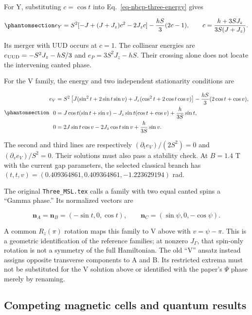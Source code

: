 For Y, substituting \(c=\cos t\) into Eq.~\ref{eq-nbcp-three-energy}
gives

\begin{equation}\phantomsection\label{eq-nbcp-y-energy}{
e_Y=S^2[-J+(J+J_z)c^2-2J_zc]-\frac{hS}{3}(2c-1),
\qquad c=\frac{h+3SJ_z}{3S(J+J_z)}.
}\end{equation}

Its merger with UUD occurs at \(c=1\). The collinear energies are
\(e_{\rm UUD}=-S^2J_z-hS/3\) and \(e_P=3S^2J_z-hS\). Their crossing
alone does not locate the intervening canted phase.

For the V family, the energy and two independent stationarity conditions
are

\begin{equation}\phantomsection\label{eq-nbcp-v-stationarity}{
\begin{aligned}
e_V={}&S^2\left[J(\sin^2t+2\sin t\sin v)
+J_z(\cos^2t+2\cos t\cos v)\right]
-\frac{hS}{3}(2\cos t+\cos v),\\
0={}&J\cos t(\sin t+\sin v)-J_z\sin t(\cos t+\cos v)
+\frac{h}{3S}\sin t,\\
0={}&2J\sin t\cos v-2J_z\cos t\sin v+\frac{h}{3S}\sin v.
\end{aligned}
}\end{equation}

The second and third lines are respectively
\((\partial_t e_V)/(2S^2)=0\) and \((\partial_v e_V)/S^2=0\). Their
solutions must also pass a stability check. At \(B=1.4\) T with the
current gap parameters, the selected classical branch has
\((t,t,v)=(0.409364861,0.409364861,-1.223629194)\) rad.

The original {\small\texttt{\nolinkurl{Three_MSL.tex}}} calls a family
with two equal canted spins a ``Gamma phase.'' Its normalized vectors
are

\[
\mathbf n_A=\mathbf n_B=(-\sin t,0,\cos t),
\qquad \mathbf n_C=(\sin\psi,0,-\cos\psi).
\]

A common \(R_z(\pi)\) rotation maps this family to V above with
\(v=\psi-\pi\). This is a geometric identification of the reference
families; at nonzero \(J_\Gamma\), that spin-only rotation is not a
symmetry of the full Hamiltonian. The old ``V'' ansatz instead assigns
opposite transverse components to A and B. Its restricted extrema must
not be substituted for the V solution above or identified with the
paper's \(\Psi\) phase merely by renaming.

\subsection{Competing magnetic cells and quantum
results}\label{competing-magnetic-cells-and-quantum-results}

